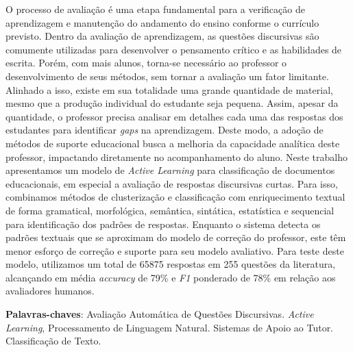 O processo de avaliação é uma etapa fundamental para a verificação de aprendizagem e manutenção do andamento do ensino conforme o currículo previsto. Dentro da avaliação de aprendizagem, as questões discursivas são comumente utilizadas para desenvolver o pensamento crítico e as habilidades de escrita. Porém, com mais alunos, torna-se necessário ao professor o desenvolvimento de seus métodos, sem tornar a avaliação um fator limitante. Alinhado a isso, existe em sua totalidade uma grande quantidade de material, mesmo que a produção individual do estudante seja pequena. Assim, apesar da quantidade, o professor precisa analisar em detalhes cada uma das respostas dos estudantes para identificar \textit{gaps} na aprendizagem. Deste modo, a adoção de métodos de suporte educacional busca a melhoria da capacidade analítica deste professor, impactando diretamente no acompanhamento do aluno. Neste trabalho apresentamos um modelo de \textit{Active Learning} para classificação de documentos educacionais, em especial a avaliação de respostas discursivas curtas. Para isso, combinamos métodos de clusterização e classificação com enriquecimento textual de forma gramatical, morfológica, semântica, sintática, estatística e sequencial para identificação dos padrões de respostas. Enquanto o sistema detecta os padrões textuais que se aproximam do modelo de correção do professor, este têm menor esforço de correção e suporte para seu modelo avaliativo. Para teste deste modelo, utilizamos um total de 65875 respostas em 255 questões da literatura, alcançando em média \textit{accuracy} de 79\% e \textit{F1} ponderado de 78\% em relação aos avaliadores humanos.


\textbf{Palavras-chaves}: Avaliação Automática de Questões Discursivas. \textit{Active Learning}, Processamento de Linguagem Natural. Sistemas de Apoio ao Tutor. Classificação de Texto.